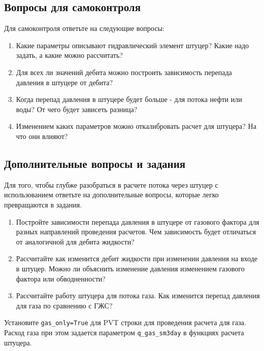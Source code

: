 \subsection{Вопросы для самоконтроля}
Для самоконтроля ответьте на следующие вопросы:

\begin{enumerate}
	
	\item Какие параметры описывают гидравлический элемент штуцер? Какие надо задать, а какие можно рассчитать?
	\item Для всех ли значений дебита можно построить зависимость перепада давления в штуцере от дебита?
	\item Когда перепад давления в штуцере будет больше - для потока нефти или воды? От чего будет зависеть разница?
	\item Изменением каких параметров можно откалибровать расчет для штуцера? На что они влияют?
	
\end{enumerate}

\subsection{Дополнительные вопросы и задания}

Для того, чтобы глубже разобраться в расчете потока через штуцер с использованием \unf{} ответьте на дополнительные вопросы, которые легко превращаются в задания.

\begin{enumerate}
	
	\item  Постройте зависимости перепада давления в штуцере от газового фактора для разных направлений проведения расчетов. Чем зависимость будет отличаться от аналогичной для дебита жидкости? 
	\item Рассчитайте как изменится дебит жидкости при изменении давления на входе в штуцер. Можно ли объяснить изменение давления изменением газового фактора или обводненности?
	\item Рассчитайте работу штуцера для потока газа.  Как изменится перепад давления для газа по сравнению с ГЖС?
	
\end{enumerate}

Установите \texttt{gas_only=True} для PVT строки для проведения расчета для газа. Расход газа при этом задается параметром \texttt{q_gas_sm3day} в функциях расчета штуцера.